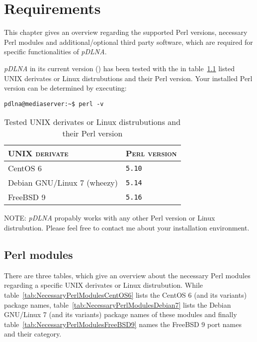 %
%

\chapter{Requirements}
\label{require}

This chapter gives an overview regarding the supported Perl versions, necessary Perl modules and additional/optional third party software, which are required for specific functionalities of {\em pDLNA}.

{\em pDLNA} in its current version (\pDLNAversion) has been tested with the in table~\ref{tab:testedunixdistris} listed UNIX derivates or Linux distrubutions and their Perl version. Your installed Perl version can be determined by executing:
\begin{lstlisting}
pdlna@mediaserver:~$ perl -v
\end{lstlisting}

\begin{table}[!ht]
	\centering
	\begin{tabular}{|p{15em}|p{18em}|}
		\hline
		\textsc{UNIX derivate} 								& \textsc{Perl version} \\
		\hline
		\hline
		CentOS 6															& \verb|5.10| \\
		\hline
		Debian GNU/Linux 7 (wheezy)						& \verb|5.14| \\
		\hline
		FreeBSD 9															& \verb|5.16| \\
		\hline
	\end{tabular}
	\caption{Tested UNIX derivates or Linux distrubutions and their Perl version}
	\label{tab:testedunixdistris}
\end{table}

\begin{colframenote}
\textsc{NOTE:} {\em pDLNA} propably works with any other Perl version or Linux distrubution. Please feel free to contact me about your installation environment.
\end{colframenote}

\section{Perl modules}

There are three tables, which give an overview about the necessary Perl modules regarding a specific UNIX derivates or Linux distrubution. While table~\ref{tab:NecessaryPerlModulesCentOS6} lists the CentOS 6 (and its variants) package names, table~\ref{tab:NecessaryPerlModulesDebian7} lists the Debian GNU/Linux 7 (and its variants) package names of these modules and finally table~\ref{tab:NecessaryPerlModulesFreeBSD9} names the FreeBSD 9 port names and their category.


